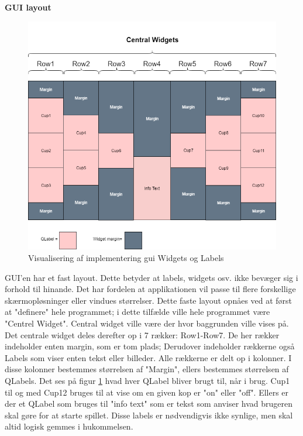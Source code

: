 \documentclass[Softwaredesign/Softwaredesign_main.tex]{subfiles}
\begin{document}
\textbf{GUI layout}
\begin{figure}
    \centering
    \includegraphics[scale=0.5]{Softwaredesign/GUI/Pictures/Boards_design.png}
    \caption{Visualisering af implementering gui Widgets og Labels}
    \label{gui_design_implementering}
\end{figure}

GUI'en har et fast layout. Dette betyder at labels, widgets osv. ikke bevæger sig i forhold til hinande. Det har fordelen at applikationen vil passe til flere forskellige skærmopløsninger eller vindues størrelser. Dette faste layout opnåes ved at først at "definere" hele programmet; i dette tilfælde ville hele programmet være "Centrel Widget". Central widget ville være der hvor baggrunden ville vises på. Det centrale widget deles derefter op i 7 rækker: Row1-Row7. De her rækker indeholder enten margin, som er tom plads; Derudover indeholder rækkerne også Labels som viser enten tekst eller billeder. Alle rækkerne er delt op i kolonner. I disse kolonner bestemmes størrelsen af "Margin", ellers bestemmes størrelsen af QLabels. Det ses på figur \ref{gui_design_implementering} hvad hver QLabel bliver brugt til, når i brug. Cup1 til og med Cup12 bruges til at vise om en given kop er "on" eller "off". Ellers er der et QLabel som bruges til "info text" som er tekst som anviser hvad brugeren skal gøre for at starte spillet. Disse labels er nødvendigvis ikke synlige, men skal altid logisk gemmes i hukommelsen.
\end{document}

